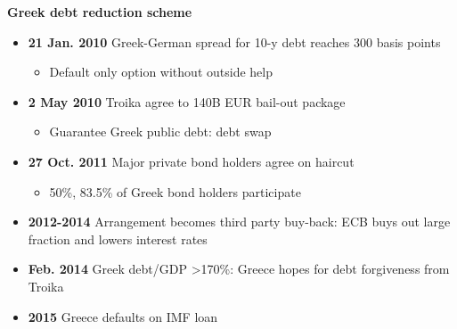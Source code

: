 \documentclass{beamer}
\begin{document}
\begin{frame}
  \textbf{Greek debt reduction scheme}
  \begin{itemize}
    \item \textbf{21 Jan. 2010} Greek-German spread for 10-y debt reaches 300 basis points
    \begin{itemize}
      \item Default only option without outside help
    \end{itemize}
    \item \textbf{2 May 2010} Troika agree to 140B EUR bail-out package
    \begin{itemize}
      \item Guarantee Greek public debt: debt swap
    \end{itemize}
    \item \textbf{27 Oct. 2011} Major private bond holders agree on haircut
    \begin{itemize}
      \item 50\%, 83.5\% of Greek bond holders participate
    \end{itemize}
    \item \textbf{2012-2014} Arrangement becomes third party buy-back: ECB buys out large fraction and lowers interest rates
  	\item \textbf{Feb. 2014} Greek debt/GDP >170\%: Greece hopes for debt forgiveness from Troika
  	\item \textbf{2015} Greece defaults on IMF loan
  \end{itemize}
\end{frame}
\end{document}
